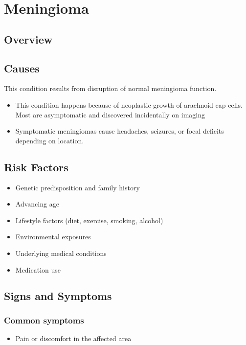 \chapter{Meningioma}
\label{sec:Meningioma}

\section{Overview}

\section{Causes}
This condition results from disruption of normal meningioma function.

\begin{itemize}[noitemsep]
  \item This condition happens because of neoplastic growth of arachnoid cap cells. Most are asymptomatic and discovered incidentally on imaging
  \item Symptomatic meningiomas cause headaches, seizures, or focal deficits depending on location.
\end{itemize}
\section{Risk Factors}


\begin{itemize}[noitemsep]
  \item Genetic predisposition and family history
  \item Advancing age
  \item Lifestyle factors (diet, exercise, smoking, alcohol)
  \item Environmental exposures
  \item Underlying medical conditions
  \item Medication use
\end{itemize}
\section{Signs and Symptoms}

\subsection{Common symptoms}
\begin{itemize}[noitemsep]
  \item Pain or discomfort in the affected area
  \end{itemize}


